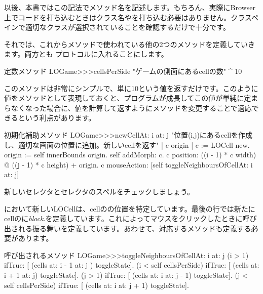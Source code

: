\documentclass[a4paper,10pt,twoside]{book}
\begin{document}

以後、本書ではこの記法でメソッド名を記述します。もちろん、実際にBrowser上でコードを打ち込むときはクラス名や\ct{>>>}を打ち込む必要はありません。クラスペインで適切なクラスが選択されていることを確認するだけで十分です。

それでは、これからメソッドで使われている他の2つのメソッドを定義していきます。両方とも プロトコルに入れることにします。

\begin{method}[sbegamecellsperside]{定数メソッド}
LOGame>>>cellsPerSide
   "ゲームの側面にあるcellの数"
   ^ 10
\end{method}

このメソッドは非常にシンプルで、単に10という値を返すだけです。このように値をメソッドとして表現しておくと、プログラムが成長してこの値が単純に定まらなくなった場合に、値を計算して返すようにメソッドを変更することで適応できるという利点があります。

\begin{method}[newCellAt:at:]{初期化補助メソッド}
LOGame>>>newCellAt: i at: j
   "位置(i,j)にあるcellを作成し、適切な画面の位置に追加。新しいcellを返す"
   | c origin |
   c := LOCell new.
   origin := self innerBounds origin.
   self addMorph: c.
   c position: ((i - 1) * c width) @ ((j - 1) * c height) + origin.
   c mouseAction: [self toggleNeighboursOfCellAt: i at: j]
\end{method}


新しいセレクタとセレクタのスペルをチェックしましょう。

 において新しいLOCellは、cellのの位置を特定しています。最後の行では新たにcellのに\emph{block}\mbox{.}を定義しています。これによってマウスをクリックしたときに呼び出される振る舞いを定義しています。あわせて、対応するメソッドも定義する必要があります。

\begin{method}[toggleNeighboursOfCellAt:at:]{呼び出されるメソッド}
LOGame>>>toggleNeighboursOfCellAt: i at: j
   (i > 1) ifTrue: [ (cells at: i - 1 at: j ) toggleState].
   (i < self cellsPerSide) ifTrue: [ (cells at: i + 1 at: j) toggleState].
   (j > 1) ifTrue: [ (cells at: i  at: j - 1) toggleState].
   (j < self cellsPerSide) ifTrue: [ (cells at: i at: j + 1) toggleState].
\end{method}
\end{document}
